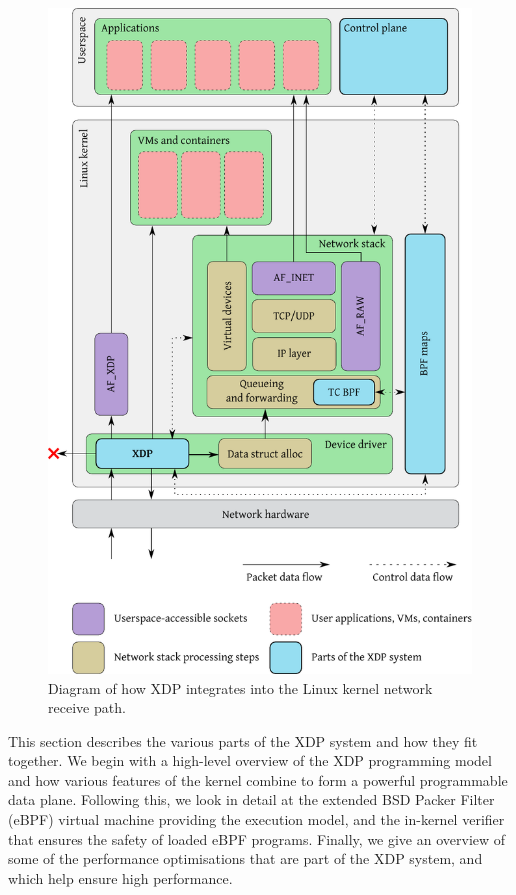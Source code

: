 \documentclass[10pt,sigconf]{acmart}
\begin{document}
\begin{figure}[t]
\centering
\includegraphics[width=\linewidth]{figures/kernel-diagram.pdf}
\caption{\label{fig:xdp-kernel} Diagram of how XDP integrates into the Linux
  kernel network receive path.}
\end{figure}


This section describes the various parts of the XDP system and how they fit
together. We begin with a high-level overview of the XDP programming model and
how various features of the kernel combine to form a powerful programmable data
plane. Following this, we look in detail at the extended BSD Packer Filter
(eBPF) virtual machine providing the execution model, and the in-kernel verifier
that ensures the safety of loaded eBPF programs. Finally, we give an overview of
some of the performance optimisations that are part of the XDP system, and which
help ensure high performance.
\end{document}
